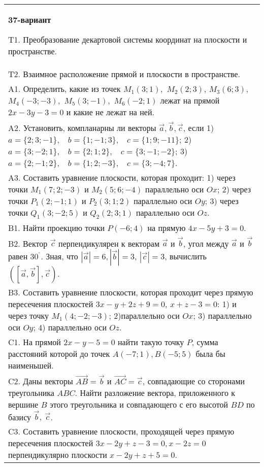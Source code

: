 \documentclass{article}
\begin{document}
\begin{tabular}{m{17cm}}
\textbf{37-вариант}
\newline

T1. 
Преобразование декартовой системы координат на плоскости и пространстве. \\
T2. 
Взаимное расположение прямой и плоскости в пространстве.
 \\
A1. 
Определить, какие из точек \(M_{1}(3;1),\) \(M_{2}(2;3)\), \(M_{3}(6;3),\) \(M_{4}( - 3; - 3),\) \(M_{5}(3; - 1),\) \(M_{6}( - 2;1)\) лежат на прямой \(2x - 3y - 3 = 0\) и какие не лежат на ней.
 \\
A2. 
Установить, компланарны ли векторы \(\overrightarrow{a},\overrightarrow{b},\overrightarrow{c}\), если 1)\(a = \{ 2;3; - 1\},\ \ \ \ b = \{ 1; - 1;3\},\ \ \ \ c = \{ 1;9; - 11\}\); 2)\(a = \{ 3; - 2;1\},\ \ \ \ b = \{ 2;1;2\},\ \ \ \ c = \{ 3; - 1; - 2\}\); 3)\(a = \{ 2; - 1;2\},\ \ \ \ b = \{ 1;2; - 3\},\ \ \ \ c = \{ 3; - 4;7\}\). \\
A3. 
Составить уравнение плоскости, которая проходит: 1) через точки \(M_{1}(7;2; - 3)\) и \(M_{2}(5;6; - 4)\) параллельно оси \(Ox\); 2) через точки \(P_{1}(2; - 1;1)\) и \(P_{2}(3;1;2)\) параллельно оси \(Oy\); 3) через точки \(Q_{1}(3; - 2;5)\) и \(Q_{2}(2;3;1)\) параллельно оси \(Oz\).
 \\
B1. 
Найти проекцию точки \(P( - 6;4)\) на прямую \(4x - 5y + 3 = 0\).
 \\
B2. 
Вектор \(\overrightarrow{c}\) перпендикулярен к векторам \(\overrightarrow{a}\) и \(\overrightarrow{b}\), угол между \(\overrightarrow{a}\) и \(\overrightarrow{b}\) равен \(30^{{^\circ}}\). Зная, что \(|\overrightarrow{a}| = 6,|\overrightarrow{b}| = 3\), \(|\overrightarrow{c}| = 3\), вычислить \(\left( \left\lbrack \overrightarrow{a},\overrightarrow{b} \right\rbrack,\overrightarrow{c} \right)\).
 \\
B3. 
Составить уравнение плоскости, которая проходит через прямую пересечения плоскостей \(3x - y + 2z + 9 = 0\), \(x + z - 3 = 0\): 1) и через точку \(M_{1}(4; - 2; - 3)\); 2)параллельно оси \(Ox\); 3) параллельно оси \(Oy\); 4) параллельно оси \(Oz\).
 \\
C1. 
На прямой \(2x - y - 5 = 0\) найти такую точку \(P\), сумма расстояний которой до точек \(A( - 7;1),B( - 5;5)\) была бы наименьшей.
 \\
C2. 
Даны векторы \(\overrightarrow{AB} = \overrightarrow{b}\) и \(\overrightarrow{AC} = \overrightarrow{c}\), совпадающие со сторонами треугольника \(ABC\). Найти разложение вектора, приложенного к вершине \(B\) этого треугольника и совпадающего с его высотой \(BD\) по базису \(\overrightarrow{b},\ \overrightarrow{c}\).
 \\
C3. 
Составить уравнение плоскости, проходящей через прямую пересечения плоскостей \(3x - 2y + z - 3 = 0,x - 2z = 0\) перпендикулярно плоскости \(x - 2y + z + 5 = 0\).
 \\

\end{tabular}
\vspace{1cm}
\end{document}
